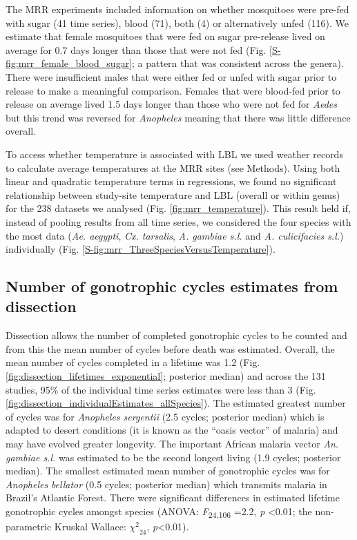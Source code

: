 \documentclass[]{article}
\begin{document}
The MRR experiments included information on whether mosquitoes were
pre-fed with sugar (41 time series), blood (71), both (4) or
alternatively unfed (116). We estimate that female mosquitoes that were
fed on sugar pre-release lived on average for 0.7 days longer than those
that were not fed (Fig. \ref{S-fig:mrr_female_blood_sugar}; a pattern that was consistent across the
genera). There were insufficient males that were either fed or unfed
with sugar prior to release to make a meaningful comparison. Females
that were blood-fed prior to release on average lived 1.5 days longer
than those who were not fed for \emph{Aedes} but this trend was reversed
for \emph{Anopheles} meaning that there was little difference overall.

To access whether temperature is associated with LBL we used weather
records to calculate average temperatures at the MRR sites (see
Methods). Using both linear and quadratic temperature terms in
regressions, we found no significant relationship between study-site
temperature and LBL (overall or within genus) for the 238 datasets we
analysed (Fig. \ref{fig:mrr_temperature}). This result held if, instead of pooling results from
all time series, we considered the four species with the most data
(\emph{Ae. aegypti}, \emph{Cx. tarsalis}, \emph{A. gambiae s.l.} and
\emph{A. culicifacies s.l.}) individually (Fig. \ref{S-fig:mrr_ThreeSpeciesVersusTemperature}).

\subsection{Number of gonotrophic cycles estimates from
dissection}\label{number-of-gonotrophic-cycles-estimates-from-dissection}

Dissection allows the number of completed gonotrophic cycles to be
counted and from this the mean number of cycles before death was
estimated. Overall, the mean number of cycles completed in a lifetime
was 1.2 (Fig. \ref{fig:dissection_lifetimes_exponential}; posterior median) and across the 131 studies, 95\% of
the individual time series estimates were less than 3 (Fig. \ref{fig:dissection_individualEstimates_allSpecies}). The
estimated greatest number of cycles was for \emph{Anopheles sergentii}
(2.5 cycles; posterior median) which is adapted to desert conditions (it
is known as the ``oasis vector'' of malaria) and may have evolved
greater longevity. The important African malaria vector \emph{An.
gambiae s.l.} was estimated to be the second longest living (1.9 cycles;
posterior median). The smallest estimated mean number of gonotrophic
cycles was for \emph{Anopheles} \emph{bellator} (0.5 cycles; posterior
median) which transmits malaria in Brazil's Atlantic Forest. There were
significant differences in estimated lifetime gonotrophic cycles amongst
species (ANOVA: \emph{F}\textsubscript{24,106} =2.2, \emph{p}
\textless{}0.01; the non-parametric Kruskal Wallace:
\({\chi^{2}}_{24}\), \emph{p}\textless{}0.01).
\end{document}
